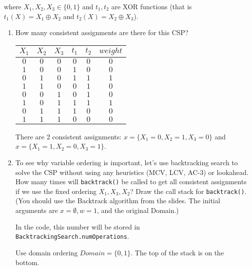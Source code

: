\documentclass[10pt]{article}
\begin{document}
\begin{enumerate}[label=(\alph*)]
	where $X_1, X_2, X_3 \in \{ 0, 1 \}$ and $t_1, t_2$ are XOR functions (that is $t_1(X) = X_1 \oplus X_2$ and $t_2(X) = X_2 \oplus X_3$).
	
	\begin{enumerate}[label=\roman*.]
		\item How many consistent assignments are there for this CSP?
		
		\begin{tabular}{c c c c c c}
		$X_1$ & $X_2$ & $X_3$ & $t_1$ & $t_2$ & $weight$\\
		\hline
  		$0$ & $0$ & $0$ & $0$ & $0$ & $0$\\
  		$1$ & $0$ & $0$ & $1$ & $0$ & $0$\\
  		$0$ & $1$ & $0$ & $1$ & $1$ & $1$\\
  		$1$ & $1$ & $0$ & $0$ & $1$ & $0$\\
  		$0$ & $0$ & $1$ & $0$ & $1$ & $0$\\
  		$1$ & $0$ & $1$ & $1$ & $1$ & $1$\\
  		$0$ & $1$ & $1$ & $1$ & $0$ & $0$\\
  		$1$ & $1$ & $1$ & $0$ & $0$ & $0$\\
  		\end{tabular}
  		
  		There are 2 consistent assignments: $x = \{ X_1 = 0, X_2 = 1, X_3 = 0 \}$ and $x = \{ X_1 = 1, X_2 = 0, X_3 = 1 \}$.
		
		\item To see why variable ordering is important, let's use backtracking search to solve the CSP without using any heuristics (MCV, LCV, AC-3) or lookahead. How many times will \texttt{backtrack()} be called to get all consistent assignments if we use the fixed ordering $X_1, X_3, X_2$? Draw the call stack for \texttt{backtrack()}. (You should use the Backtrack algorithm from the slides. The initial arguments are $x = \emptyset, w = 1$, and the original Domain.)
		
		In the code, this number will be stored in \texttt{BacktrackingSearch.numOperations}.
		
		Use domain ordering $Domain = \{ 0, 1 \}$. The top of the stack is on the bottom.
		

\end{enumerate}
\end{enumerate}
\end{document}
